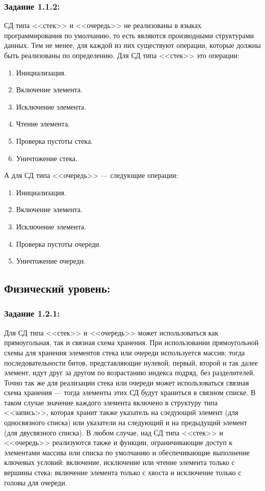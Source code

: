 \documentclass[12pt]{article}
\begin{document}
{	\subsubsection{Задание 1.1.2:}
	\label{task_1_1_2}
	СД типа <<стек>> и <<очередь>> не реализованы в языках программирования по умолчанию, то есть являются производными структурами данных. Тем не менее, для каждой из них существуют операции, которые должны быть реализованы по определению. Для СД типа <<стек>> это операции:
	
	\begin{enumerate}
	\item Инициализация.
	\item Включение элемента.
	\item Исключение элемента.
	\item Чтение элемента.
	\item Проверка пустоты стека.
	\item Уничтожение стека.
	\end{enumerate}
	
	А для СД типа <<очередь>> --- следующие операции:
	\begin{enumerate}
	\item Инициализация.
	\item Включение элемента.
	\item Исключение элемента.
	\item Проверка пустоты очереди.
	\item Уничтожение очереди.
	\end{enumerate}
	
	\subsection{Физический уровень:}
	\label{task_1_2}
	\subsubsection{Задание 1.2.1:}
	\label{task_1_2_1}
	Для СД типа <<стек>> и <<очередь>> может использоваться как прямоугольная, так и связная схема хранения. При использовании прямоугольной схемы для хранения элементов стека или очереди используется массив; тогда последовательности битов, представляющие нулевой, первый, второй и так далее элемент, идут друг за другом по возрастанию индекса подряд, без разделителей. Точно так же для реализации стека или очереди может использоваться связная схема хранения --- тогда элементы этих СД будут храниться в связном списке. В таком случае значение каждого элемента включено в структуру типа <<запись>>, которая хранит также указатель на следующий элемент (для односвязного списка) или указатели на следующий и на предыдущий элемент (для двусвязного списка). В любом случае, над СД типа <<стек>> и <<очередь>> реализуются также и функции, ограничивающие доступ к элементами массива или списка по умолчанию и обеспечивающие выполнение ключевых условий: включение, исключение или чтение элемента только с вершины стека; включение элемента только с хвоста и исключение только с головы для очереди.
	
}
\end{document}
